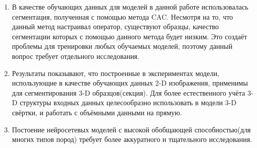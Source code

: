 \documentclass[14pt, a4paper, oneside, bold]{extarticle}
\begin{document}
\begin{enumerate}

	\item В качестве обучающих данных для моделей в данной работе использовалась сегментация, полученная с помощью метода CAC. Несмотря на то, что данный метод настраивал оператор, существуют образцы, качество сегментации которых с помощью данного метода будет  низким. Это создаёт проблемы для тренировки любых обучаемых моделей, поэтому данный вопрос требует отдельного исследования. 

	\item Результаты показывают, что построенные в экспериментах модели, использующие в качестве обучающих данных 2-D изображения, применимы для сегментирования 3-D образцов(секция). Для более естественного учёта 3-D структуры входных данных целесообразно использовать в модели 3-D свёртки, и работать с объёмными данными на прямую. 
	
	\item Постоение нейросетевых моделей с высокой обобщающей способностью(для многих типов пород) требует более аккуратного и тщательного исследования. 

\end{enumerate}

\newpage


\end{document}
